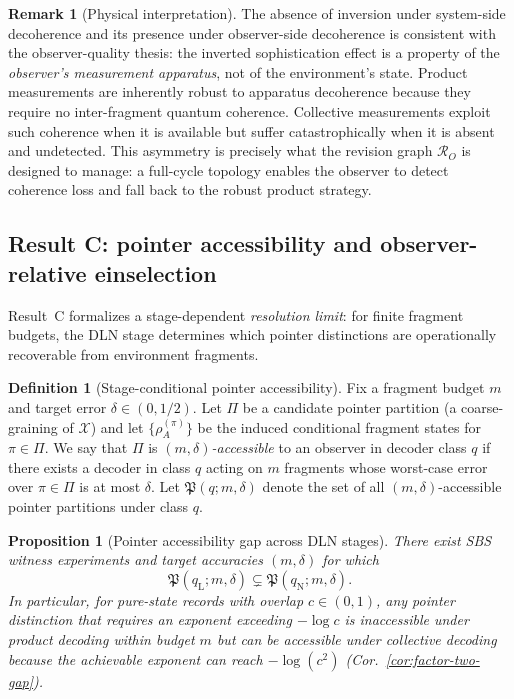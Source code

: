 \documentclass[11pt]{article}
\newcommand{\cX}{\mathcal{X}}
\newcommand{\cR}{\mathcal{R}}
\newcommand{\1}{\mathbf{1}}
\theoremstyle{definition}
\newtheorem{definition}{Definition}
\newtheorem{remark}{Remark}
\theoremstyle{plain}
\newtheorem{proposition}{Proposition}
\begin{document}
\begin{remark}[Physical interpretation]
\label{rem:decoherence-physical}
The absence of inversion under system-side decoherence and its presence under observer-side decoherence is consistent with the observer-quality thesis: the inverted sophistication effect is a property of the \emph{observer's measurement apparatus}, not of the environment's state.  Product measurements are inherently robust to apparatus decoherence because they require no inter-fragment quantum coherence.  Collective measurements exploit such coherence when it is available but suffer catastrophically when it is absent and undetected.  This asymmetry is precisely what the revision graph $\cR_O$ is designed to manage: a full-cycle topology enables the observer to detect coherence loss and fall back to the robust product strategy.
\end{remark}

\subsection{Result C: pointer accessibility and observer-relative einselection}

Result~C formalizes a stage-dependent \emph{resolution limit}: for finite fragment budgets, the DLN stage determines which pointer distinctions are operationally recoverable from environment fragments.

\begin{definition}[Stage-conditional pointer accessibility]
\label{def:pointer-accessibility}
Fix a fragment budget $m$ and target error $\delta\in(0,1/2)$.
Let $\Pi$ be a candidate pointer partition (a coarse-graining of $\cX$) and let $\{\rho_{A}^{(\pi)}\}$ be the induced conditional fragment states for $\pi\in\Pi$.
We say that $\Pi$ is \emph{$(m,\delta)$-accessible} to an observer in decoder class $q$ if there exists a decoder in class $q$ acting on $m$ fragments whose worst-case error over $\pi\in\Pi$ is at most $\delta$.
Let $\mathfrak{P}(q;m,\delta)$ denote the set of all $(m,\delta)$-accessible pointer partitions under class $q$.
\end{definition}

\begin{proposition}[Pointer accessibility gap across DLN stages]
\label{prop:pointer-accessibility-gap}
There exist SBS witness experiments and target accuracies $(m,\delta)$ for which
\[
\mathfrak{P}(q_{\mathrm{L}};m,\delta)\subsetneq \mathfrak{P}(q_{\mathrm{N}};m,\delta).
\]
In particular, for pure-state records with overlap $c\in(0,1)$, any pointer distinction that requires an exponent exceeding $-\log c$ is inaccessible under product decoding within budget $m$ but can be accessible under collective decoding because the achievable exponent can reach $-\log(c^2)$ (Cor.~\ref{cor:factor-two-gap}).
\end{proposition}
\end{document}
